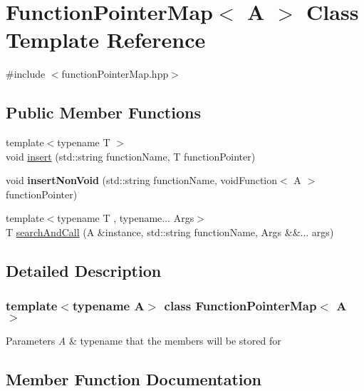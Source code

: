 \hypertarget{classFunctionPointerMap}{}\section{Function\+Pointer\+Map$<$ A $>$ Class Template Reference}
\label{classFunctionPointerMap}


{\ttfamily \#include $<$function\+Pointer\+Map.\+hpp$>$}

\subsection*{Public Member Functions}
\begin{DoxyCompactItemize}
\item 
{\footnotesize template$<$typename T $>$ }\\void \hyperlink{classFunctionPointerMap_af750cbe11e423835a4d456aebc1af7e8}{insert} (std\+::string function\+Name, T function\+Pointer)
\item 
\mbox{\label{classFunctionPointerMap_aac8051103a899531c2b5c1e38fc77d28}} 
void {\bfseries insert\+Non\+Void} (std\+::string function\+Name, void\+Function$<$ A $>$ function\+Pointer)
\item 
{\footnotesize template$<$typename T , typename... Args$>$ }\\T \hyperlink{classFunctionPointerMap_ae750181faa3848ddbdb76b58ae54f041}{search\+And\+Call} (A \&instance, std\+::string function\+Name, Args \&\&... args)
\end{DoxyCompactItemize}


\subsection{Detailed Description}
\subsubsection*{template$<$typename A$>$\newline
class Function\+Pointer\+Map$<$ A $>$}


\begin{DoxyParams}{Parameters}
{\em A} & typename that the members will be stored for \\
\hline
\end{DoxyParams}


\subsection{Member Function Documentation}
\mbox{\label{classFunctionPointerMap_af750cbe11e423835a4d456aebc1af7e8}} 
